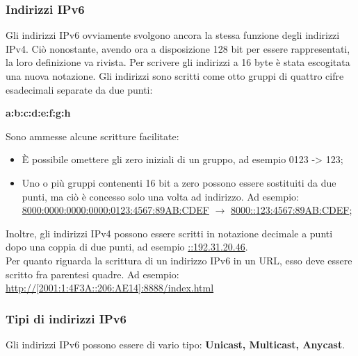 \documentclass{article}
\begin{document}
            \subsubsection*{Indirizzi IPv6}
            Gli indirizzi IPv6 ovviamente svolgono ancora la stessa funzione degli indirizzi IPv4. Ciò
            nonostante, avendo ora a disposizione 128 bit per essere rappresentati, la loro definizione va
            rivista. Per scrivere gli indirizzi a 16 byte è stata escogitata una nuova notazione. Gli indirizzi
            sono scritti come otto gruppi di quattro cifre esadecimali separate da due punti:
            \begin{center}
                \textbf{a:b:c:d:e:f:g:h}
            \end{center}
            Sono ammesse alcune scritture facilitate:
            \begin{itemize}
                \item È possibile omettere gli zero iniziali di un gruppo, ad esempio 0123 -> 123;
                \item Uno o più gruppi contenenti 16 bit a zero possono essere sostituiti da due punti, ma ciò
                è concesso solo una volta ad indirizzo. Ad esempio:
                \underline{8000:0000:0000:0000:0123:4567:89AB:CDEF} $\rightarrow$ \underline{8000::123:4567:89AB:CDEF};
            \end{itemize}

            Inoltre, gli indirizzi IPv4 possono essere scritti in notazione decimale a punti dopo una coppia
            di due punti, ad esempio \underline{::192.31.20.46}.\\

            Per quanto riguarda la scrittura di un indirizzo IPv6 in un URL, esso deve essere scritto fra
            parentesi quadre. Ad esempio: \url{http://[2001:1:4F3A::206:AE14]:8888/index.html}
            
            \subsubsection*{Tipi di indirizzi IPv6}
            Gli indirizzi IPv6 possono essere di vario tipo: \textbf{Unicast, Multicast, Anycast}.
            
\end{document}
